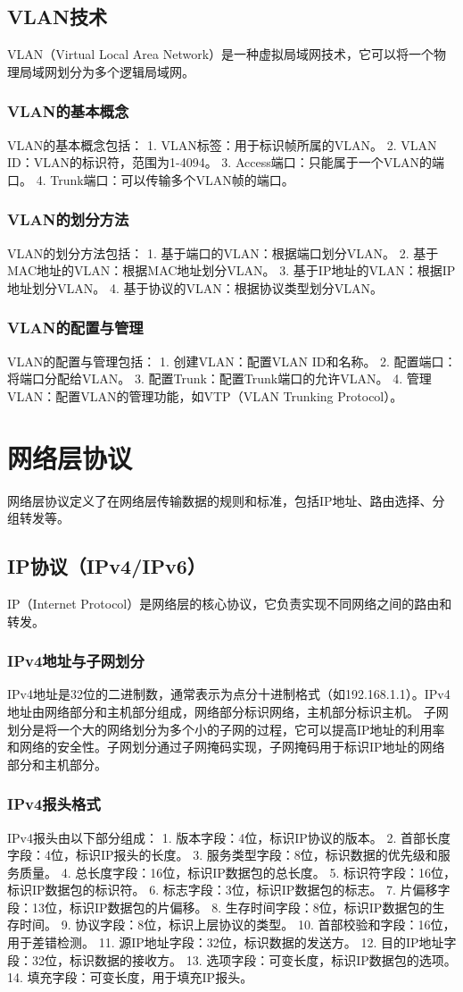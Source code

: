 \documentclass{book}
\begin{document}
\subsection{VLAN技术}
VLAN（Virtual Local Area Network）是一种虚拟局域网技术，它可以将一个物理局域网划分为多个逻辑局域网。
\subsubsection{VLAN的基本概念}
VLAN的基本概念包括：
1. VLAN标签：用于标识帧所属的VLAN。
2. VLAN ID：VLAN的标识符，范围为1-4094。
3. Access端口：只能属于一个VLAN的端口。
4. Trunk端口：可以传输多个VLAN帧的端口。
\subsubsection{VLAN的划分方法}
VLAN的划分方法包括：
1. 基于端口的VLAN：根据端口划分VLAN。
2. 基于MAC地址的VLAN：根据MAC地址划分VLAN。
3. 基于IP地址的VLAN：根据IP地址划分VLAN。
4. 基于协议的VLAN：根据协议类型划分VLAN。
\subsubsection{VLAN的配置与管理}
VLAN的配置与管理包括：
1. 创建VLAN：配置VLAN ID和名称。
2. 配置端口：将端口分配给VLAN。
3. 配置Trunk：配置Trunk端口的允许VLAN。
4. 管理VLAN：配置VLAN的管理功能，如VTP（VLAN Trunking Protocol）。
\section{网络层协议}
网络层协议定义了在网络层传输数据的规则和标准，包括IP地址、路由选择、分组转发等。
\subsection{IP协议（IPv4/IPv6）}
IP（Internet Protocol）是网络层的核心协议，它负责实现不同网络之间的路由和转发。
\subsubsection{IPv4地址与子网划分}
IPv4地址是32位的二进制数，通常表示为点分十进制格式（如192.168.1.1）。IPv4地址由网络部分和主机部分组成，网络部分标识网络，主机部分标识主机。
子网划分是将一个大的网络划分为多个小的子网的过程，它可以提高IP地址的利用率和网络的安全性。子网划分通过子网掩码实现，子网掩码用于标识IP地址的网络部分和主机部分。
\subsubsection{IPv4报头格式}
IPv4报头由以下部分组成：
1. 版本字段：4位，标识IP协议的版本。
2. 首部长度字段：4位，标识IP报头的长度。
3. 服务类型字段：8位，标识数据的优先级和服务质量。
4. 总长度字段：16位，标识IP数据包的总长度。
5. 标识符字段：16位，标识IP数据包的标识符。
6. 标志字段：3位，标识IP数据包的标志。
7. 片偏移字段：13位，标识IP数据包的片偏移。
8. 生存时间字段：8位，标识IP数据包的生存时间。
9. 协议字段：8位，标识上层协议的类型。
10. 首部校验和字段：16位，用于差错检测。
11. 源IP地址字段：32位，标识数据的发送方。
12. 目的IP地址字段：32位，标识数据的接收方。
13. 选项字段：可变长度，标识IP数据包的选项。
14. 填充字段：可变长度，用于填充IP报头。
\end{document}

